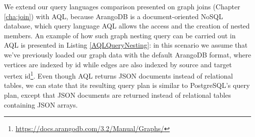 We extend our query languages comparison presented on graph joins (Chapter \ref{cha:join}) with AQL, because ArangoDB is a document-oriented NoSQL database, which query language AQL allows the access and the creation of nested members. An example of how such graph nesting query can be carried out in AQL is presented in Listing \ref{AQLQueryNesting}: in this scenario we assume that we've previously loaded our graph data with the default ArangoDB format, where  vertices are indexed by id while edges are also indexed by source and target vertex id\footnote{\url{https://docs.arangodb.com/3.2/Manual/Graphs/}}. Even though AQL returns JSON documents instead of relational tables, we can state that its resulting query plan is similar to PostgreSQL's query plan, except that JSON documents are returned instead of relational tables containing JSON arrays.
%
%
%
%
%
%
%
